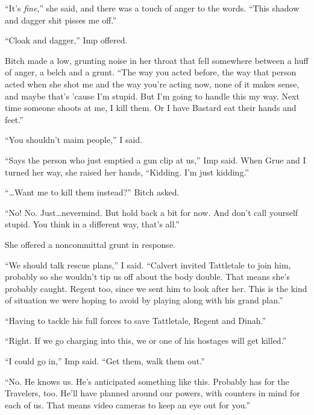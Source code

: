 ``It's \emph{fine},'' she said, and there was a touch of anger to the words.  ``This shadow and dagger shit pisses me off.''



``Cloak and dagger,'' Imp offered.



Bitch made a low, grunting noise in her throat that fell somewhere between a huff of anger, a belch and a grunt.  ``The way you acted before, the way that person acted when she shot me and the way you're acting now, none of it makes sense, and maybe that's 'cause I'm stupid.  But I'm going to handle this my way.  Next time someone shoots at me, I kill them.  Or I have Bastard eat their hands and feet.''



``You shouldn't maim people,'' I said.



``Says the person who just emptied a gun clip at us,'' Imp said.  When Grue and I turned her way, she raised her hands, ``Kidding.  I'm just kidding.''



``\ldots{}Want me to kill them instead?''  Bitch asked.



``No!  No.  Just\ldots nevermind.  But hold back a bit for now.  And don't call yourself stupid.  You think in a different way, that's all.''



She offered a noncommittal grunt in response.



``We should talk rescue plans,'' I said.  ``Calvert invited Tattletale to join him, probably so she wouldn't tip us off about the body double.  That means she's probably caught.  Regent too, since we sent him to look after her.  This is the kind of situation we were hoping to avoid by playing along with his grand plan.''



``Having to tackle his full forces to save Tattletale, Regent and Dinah.''



``Right.  If we go charging into this, we or one of his hostages will get killed.''



``I could go in,'' Imp said.  ``Get them, walk them out.''



``No.  He knows us.  He's anticipated something like this.  Probably has for the Travelers, too.  He'll have planned around our powers, with counters in mind for each of us.  That means video cameras to keep an eye out for you.''



